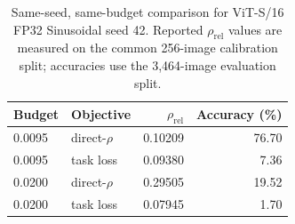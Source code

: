 \begin{table}[t]
\centering
\caption{Same-seed, same-budget comparison for ViT-S/16 FP32 Sinusoidal
seed 42. Reported $\rho_{\mathrm{rel}}$ values are measured on the common
256-image calibration split; accuracies use the 3,464-image evaluation split.}
\label{tab:objective-comparison}
\begin{tabular}{llrr}
\toprule
Budget & Objective & $\rho_{\mathrm{rel}}$ & Accuracy (\%) \\
\midrule
0.0095 & direct-$\rho$ & 0.10209 & 76.70 \\
0.0095 & task loss & 0.09380 & 7.36 \\
0.0200 & direct-$\rho$ & 0.29505 & 19.52 \\
0.0200 & task loss & 0.07945 & 1.70 \\
\bottomrule
\end{tabular}
\end{table}
